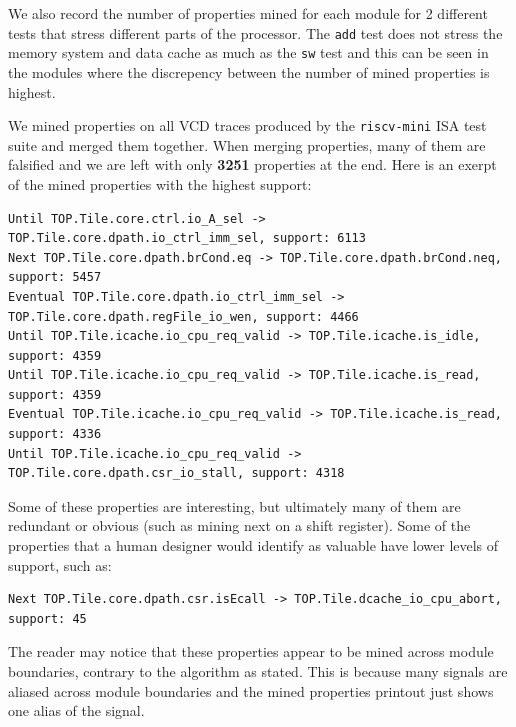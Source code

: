 \documentclass[acmlarge,11pt]{acmart}
\begin{document}
We also record the number of properties mined for each module for 2 different tests that stress different parts of the processor.
The \texttt{add} test does not stress the memory system and data cache as much as the \texttt{sw} test and this can be seen in the modules where the discrepency between the number of mined properties is highest.

We mined properties on all VCD traces produced by the \texttt{riscv-mini} ISA test suite and merged them together.
When merging properties, many of them are falsified and we are left with only \textbf{3251} properties at the end.
Here is an exerpt of the mined properties with the highest support:

\begin{verbatim}
Until TOP.Tile.core.ctrl.io_A_sel -> TOP.Tile.core.dpath.io_ctrl_imm_sel, support: 6113
Next TOP.Tile.core.dpath.brCond.eq -> TOP.Tile.core.dpath.brCond.neq, support: 5457
Eventual TOP.Tile.core.dpath.io_ctrl_imm_sel -> TOP.Tile.core.dpath.regFile_io_wen, support: 4466
Until TOP.Tile.icache.io_cpu_req_valid -> TOP.Tile.icache.is_idle, support: 4359
Until TOP.Tile.icache.io_cpu_req_valid -> TOP.Tile.icache.is_read, support: 4359
Eventual TOP.Tile.icache.io_cpu_req_valid -> TOP.Tile.icache.is_read, support: 4336
Until TOP.Tile.icache.io_cpu_req_valid -> TOP.Tile.core.dpath.csr_io_stall, support: 4318
\end{verbatim}

Some of these properties are interesting, but ultimately many of them are redundant or obvious (such as mining next on a shift register).
Some of the properties that a human designer would identify as valuable have lower levels of support, such as:

\begin{verbatim}
Next TOP.Tile.core.dpath.csr.isEcall -> TOP.Tile.dcache_io_cpu_abort, support: 45
\end{verbatim}

The reader may notice that these properties appear to be mined across module boundaries, contrary to the algorithm as stated.
This is because many signals are aliased across module boundaries and the mined properties printout just shows one alias of the signal.
\end{document}
